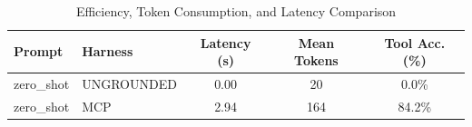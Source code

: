 \begin{table}[ht]
\centering
\small
\caption{Efficiency, Token Consumption, and Latency Comparison}
\label{tab:assistant_efficiency}
\begin{tabular}{llccc}
\toprule
\textbf{Prompt} & \textbf{Harness} & \textbf{Latency (s)} & \textbf{Mean Tokens} & \textbf{Tool Acc. (\%)} \\
\midrule
zero\_shot & UNGROUNDED & 0.00 & 20 & 0.0\% \\
zero\_shot & MCP & 2.94 & 164 & 84.2\% \\
\bottomrule
\end{tabular}
\end{table}
